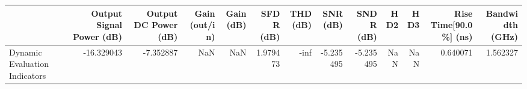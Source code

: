 \begin{tabular}{lrrrrrrrrrrrr}
\toprule
{} &  Output Signal Power (dB) &  Output DC Power (dB) &  Gain (out/in) &  Gain (dB) &  SFDR (dB) &  THD (dB) &  SNR (dB) &  SNDR (dB) &  HD2 &  HD3 &  Rise Time[90.0\%] (ns) &  Bandwidth (GHz) \\
\midrule
Dynamic Evaluation Indicators &                -16.329043 &             -7.352887 &            NaN &        NaN &   1.979473 &      -inf & -5.235495 &  -5.235495 &  NaN &  NaN &               0.640071 &         1.562327 \\
\bottomrule
\end{tabular}

